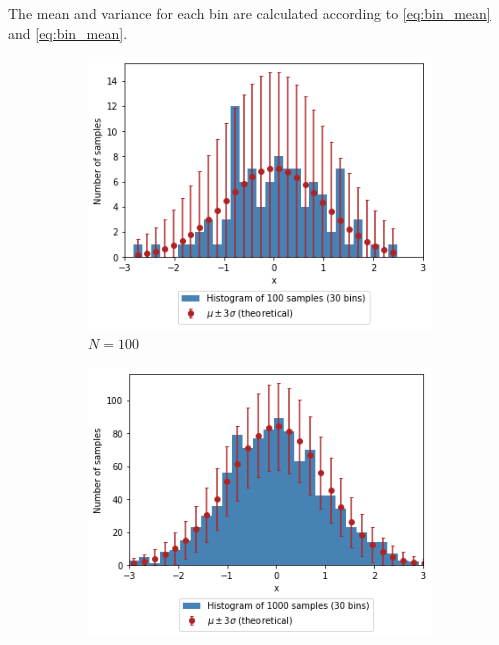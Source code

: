 \documentclass[a4paper]{article}
\begin{document}
The mean and variance for each bin are calculated according to \autoref{eq:bin_mean} and \autoref{eq:bin_mean}.

\begin{figure}[h]
    \centering
    \begin{subfigure}[b]{0.3\textwidth}
        \centering
        \includegraphics[width=\textwidth]{figures/gaussian_histogram_100.png}
        \caption{$N=100$}
        \label{fig:gaussian_histogram_100}
    \end{subfigure}
    \hfill
    \begin{subfigure}[b]{0.3\textwidth}
        \centering
        \includegraphics[width=\textwidth]{figures/gaussian_histogram_1000.png}

\end{subfigure}
\end{figure}
\end{document}
